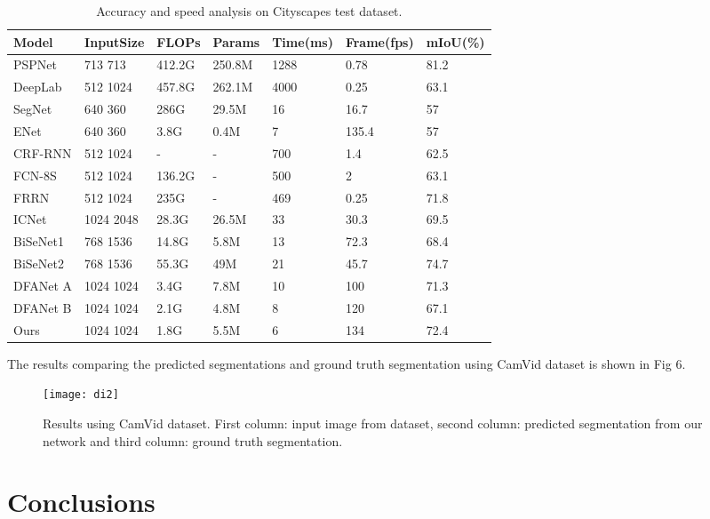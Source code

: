 \documentclass{article}
\begin{document}
\begin{table}[h]
  \caption{Accuracy and speed analysis on Cityscapes test dataset.}
  \label{sample-table6}
  \centering
  \begin{tabular}{lllllll}
  \toprule
Model &InputSize &FLOPs &Params &Time(ms) &Frame(fps) &mIoU(\%)\\
   \midrule
PSPNet \citep{zhao2017pyramid} &713  713 &412.2G &250.8M &1288 &0.78 &81.2\\
DeepLab \citep{chen2017deeplab} &512  1024 &457.8G &262.1M &4000 &0.25 &63.1\\
SegNet \citep{badrinarayanan2017segnet} &640  360 &286G &29.5M &16 &16.7 &57\\
ENet \citep{paszke2016enet} &640  360 &3.8G &0.4M &7 &135.4 &57\\
CRF-RNN \citep{zheng2015conditional} &512  1024 &- &- &700 &1.4 &62.5\\
FCN-8S \citep{long2015fully} &512  1024 &136.2G &- &500 &2 &63.1\\
FRRN \citep{pohlen2017full} &512  1024 &235G &- &469 &0.25 &71.8\\
ICNet \citep{zhao2018icnet} &1024  2048 &28.3G &26.5M &33 &30.3 &69.5\\
BiSeNet1 \citep{yu2018bisenet} &768  1536 &14.8G &5.8M &13 &72.3 &68.4\\
BiSeNet2 \citep{yu2018bisenet} &768  1536 &55.3G &49M &21 &45.7 &74.7\\
DFANet A \citep{li2019dfanet} &1024  1024 &3.4G &7.8M &10 &100 &71.3\\
DFANet B \citep{li2019dfanet} &1024  1024 &2.1G &4.8M &8 &120 &67.1\\
Ours &1024  1024 &1.8G &5.5M &6 &134 &72.4\\
    \bottomrule
  \end{tabular}
\end{table}

The results comparing the predicted segmentations and ground truth segmentation using CamVid dataset is shown in Fig 6.

\begin{figure}[htp]
    \centering
    \texttt{[image: di2]}
    \caption{Results using CamVid dataset. First column: input image from dataset, second column: predicted segmentation from our network and third column: ground truth segmentation.}
    \label{fig5}
\end{figure}

\section{Conclusions}
\end{document}
